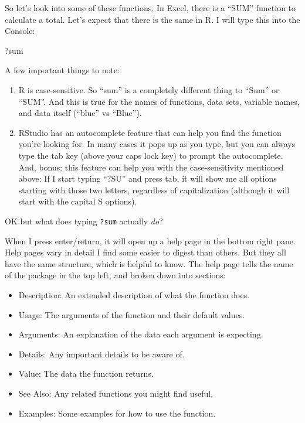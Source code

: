 \documentclass[]{book}
\newenvironment{Shaded}{\begin{snugshade}}{\end{snugshade}}
\newcommand{\NormalTok}[1]{#1}
\providecommand{\tightlist}{%
  \setlength{\itemsep}{0pt}\setlength{\parskip}{0pt}}
\begin{document}
So let's look into some of these functions. In Excel, there is a ``SUM'' function to calculate a total. Let's expect that there is the same in R. I will type this into the Console:

\begin{Shaded}
\begin{Highlighting}[]
\NormalTok{?sum}
\end{Highlighting}
\end{Shaded}

A few important things to note:

\begin{enumerate}
\def\labelenumi{\arabic{enumi}.}
\item
  R is case-sensitive. So ``sum'' is a completely different thing to ``Sum'' or ``SUM''. And this is true for the names of functions, data sets, variable names, and data itself (``blue'' vs ``Blue'').
\item
  RStudio has an autocomplete feature that can help you find the function you're looking for. In many cases it pops up as you type, but you can always type the tab key (above your caps lock key) to prompt the autocomplete. And, bonus: this feature can help you with the case-sensitivity mentioned above: If I start typing ``?SU'' and press tab, it will show me all options starting with those two letters, regardless of capitalization (although it will start with the capital S options).
\end{enumerate}

OK but what does typing \texttt{?sum} actually \emph{do}?

When I press enter/return, it will open up a help page in the bottom right pane. Help pages vary in detail I find some easier to digest than others. But they all have the same structure, which is helpful to know. The help page tells the name of the package in the top left, and broken down into sections:

\begin{itemize}
\tightlist
\item
  Description: An extended description of what the function does.
\item
  Usage: The arguments of the function and their default values.
\item
  Arguments: An explanation of the data each argument is expecting.
\item
  Details: Any important details to be aware of.
\item
  Value: The data the function returns.
\item
  See Also: Any related functions you might find useful.
\item
  Examples: Some examples for how to use the function.
\end{itemize}
\end{document}
